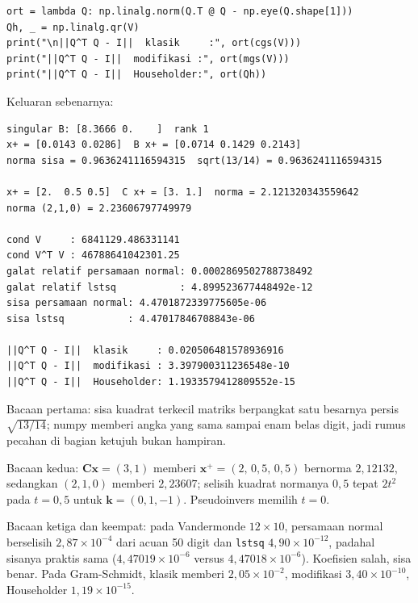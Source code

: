 \begin{lab}
\begin{verbatim}
ort = lambda Q: np.linalg.norm(Q.T @ Q - np.eye(Q.shape[1]))
Qh, _ = np.linalg.qr(V)
print("\n||Q^T Q - I||  klasik     :", ort(cgs(V)))
print("||Q^T Q - I||  modifikasi :", ort(mgs(V)))
print("||Q^T Q - I||  Householder:", ort(Qh))
\end{verbatim}
Keluaran sebenarnya:
\begin{verbatim}
singular B: [8.3666 0.    ]  rank 1
x+ = [0.0143 0.0286]  B x+ = [0.0714 0.1429 0.2143]
norma sisa = 0.9636241116594315  sqrt(13/14) = 0.9636241116594315

x+ = [2.  0.5 0.5]  C x+ = [3. 1.]  norma = 2.121320343559642
norma (2,1,0) = 2.23606797749979

cond V     : 6841129.486331141
cond V^T V : 46788641042301.25
galat relatif persamaan normal: 0.0002869502788738492
galat relatif lstsq           : 4.899523677448492e-12
sisa persamaan normal: 4.4701872339775605e-06
sisa lstsq           : 4.47017846708843e-06

||Q^T Q - I||  klasik     : 0.020506481578936916
||Q^T Q - I||  modifikasi : 3.397900311236548e-10
||Q^T Q - I||  Householder: 1.1933579412809552e-15
\end{verbatim}
\end{lab}

Bacaan pertama: sisa kuadrat terkecil matriks berpangkat satu besarnya persis
$\sqrt{13/14}$; numpy memberi angka yang sama sampai enam belas digit, jadi rumus pecahan
di bagian ketujuh bukan hampiran.

Bacaan kedua: $\mathbf{C}\mathbf{x}=(3,1)$ memberi
$\mathbf{x}^{+}=(2,\,0{,}5,\,0{,}5)$ bernorma $2{,}12132$, sedangkan $(2,1,0)$ memberi
$2{,}23607$; selisih kuadrat normanya $0{,}5$ tepat $2t^{2}$ pada $t=0{,}5$ untuk
$\mathbf{k}=(0,1,-1)$. Pseudoinvers memilih $t=0$.

Bacaan ketiga dan keempat: pada Vandermonde $12\times10$, persamaan normal berselisih
$2{,}87\times10^{-4}$ dari acuan 50 digit dan \texttt{lstsq} $4{,}90\times10^{-12}$,
padahal sisanya praktis sama ($4{,}47019\times10^{-6}$ versus $4{,}47018\times10^{-6}$).
Koefisien salah, sisa benar. Pada Gram-Schmidt,
klasik memberi $2{,}05\times10^{-2}$, modifikasi $3{,}40\times10^{-10}$, Householder
$1{,}19\times10^{-15}$.

